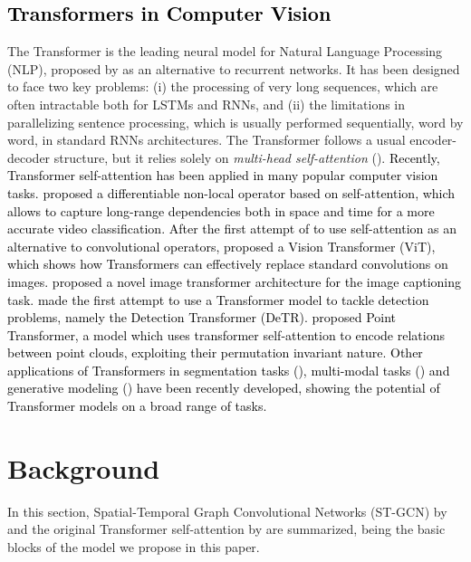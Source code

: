 \documentclass[times,twocolumn,final,authoryear]{elsarticle}
\DeclareRobustCommand{\new}[1]
{{\textcolor{black}{#1}}}
\begin{document}
\subsection{\new{Transformers in Computer Vision}}\label{transformer}
The Transformer is the leading neural model for Natural Language Processing (NLP), proposed by \cite{attention} as an alternative to recurrent networks. It has been designed to face two key problems: (i) the processing of very long sequences, which are often intractable both for LSTMs and RNNs, and (ii) the limitations in parallelizing sentence processing, which is usually performed sequentially, word by word, in standard RNNs architectures. The Transformer follows a usual encoder-decoder structure, but it relies solely on \textit{multi-head self-attention} (\cite{attention}). \new{Recently, Transformer self-attention has been applied in many popular computer vision tasks. \cite{non-local} proposed a differentiable non-local operator based on self-attention, which allows to capture long-range dependencies both in space and time for a more accurate video classification. After the first attempt of \cite{Bello_2019_ICCV} to use self-attention as an alternative to convolutional operators, \cite{dosovitskiy2020image} proposed a Vision Transformer (ViT), which shows how Transformers can effectively replace standard convolutions on images.  \cite{he2020image} proposed a novel image transformer architecture for the image captioning task.  \cite{carion2020end} made the first attempt to use a Transformer model to tackle detection problems, namely the Detection Transformer (DeTR). \cite{zhao2020point} proposed Point Transformer, a model which uses transformer self-attention to encode relations between point clouds, exploiting their permutation invariant nature. Other applications of Transformers in segmentation tasks (\cite{huang2019ccnet}), multi-modal tasks (\cite{lee2020parameter}) and generative modeling (\cite{oord2016conditional,parmar2018image}) have been recently developed, showing the potential of Transformer models on a broad range of tasks.}




\section{Background}
In this section, Spatial-Temporal Graph Convolutional Networks (ST-GCN) by \cite{yan2018spatial} and the original Transformer self-attention by \cite{attention} are summarized, being the basic blocks of the model we propose in this paper.
\end{document}
